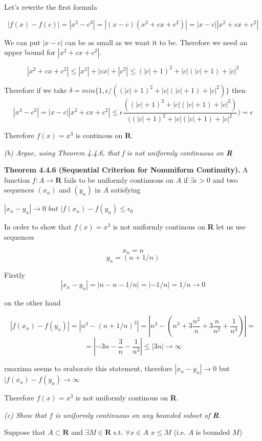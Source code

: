 \documentclass[11pt,oneside,titlepage]{book}
\begin{document}
Let's rewrite the first formula

$$ |f(x) - f(c)| = |x^{3} - c^{3}| = |(x - c)(x^{2} + cx + c^{2})| =
|x - c||x^{2} + cx + c^{2}|$$

We can put $|x - c|$ can be as small as we want it to be. Therefore we need
an upper bound for $|x^{2} + cx + c^{2}|$.

$$|x^{2} + cx + c^{2}| \leq |x^{2}| + |cx| + |c^{2}| \leq (|c| + 1)^{2} +
|c|(|c| + 1) + |c|^{2}$$



Therefore if we take
$\delta = min\{1, \epsilon/((|c| + 1)^{2} + |c|(|c| + 1) + |c|^{2})\}$
then
$$|x^3 - c^3| = |x-c||x^2 + cx + c^2| \leq \epsilon \frac{((|c| + 1)^{2} +
  |c|(|c| + 1) + |c|^{2}) }{ ((|c| + 1)^{2} + |c|(|c| + 1) + |c|^{2}})
= \epsilon$$

Therefore $f(x) = x ^3$ is continous on \textbf{R}.

\textit{(b) Argue, using Theorem 4.4.6, that f is not uniformly continuous
  on \textbf{R}}


\textbf{Theorem 4.4.6 (Sequential Criterion for Nonuniform Continuity).} A
function $f:A \to \textbf{R}$ fails to be uniformly continuous on $A$ if
$\exists \epsilon > 0 $ and  two sequences $(x_n)$ and $(y_n)$ in $A$
satisfying

$|x_n - y_n| \to 0$ $but$ $|f(x_n) - f(y_n) \leq \epsilon_0$

In order to show that $f(x) = x^3$ is not uniformly continous on
\textbf{R} let us use sequences

$$x_n = n$$
$$y_n = (n + 1/n)$$

Firstly
$$ |x_n - y_n| = |n - n - 1/n| = |-1/n| = 1/n \to 0$$

on the other hand

$$|f(x_n) - f(y_n)| = |n ^ 3 - (n + 1/n) ^ 3| = |n^3 - (n^3 + 3 \frac{n^2}{n}
+ 3 \frac{n}{n^2} + \frac{1}{n^3})| = $$
$$ = |-3n - \frac{3}{n} - \frac{1}{n^3} | \leq |3n| \to \infty$$

rmaxima seems to eraborate this statement, therefore  $|x_n - y_n| \to 0$
but $|f(x_n) - f(y_n) \to \infty$

Therefore $f(x) = x^3$ is not uniformly continous on \textbf{R}.

\textit{(c) Show that $f$ is uniformly continuous on any bounded subset
  of \textbf{R}.}

Suppose that $A \subset \textbf{R}$ and $\exists M \in \textbf{R}$ s.t.
$\forall x \in A$ $x \leq M$ (i.e. $A$ is bounded $M$)
\end{document}
